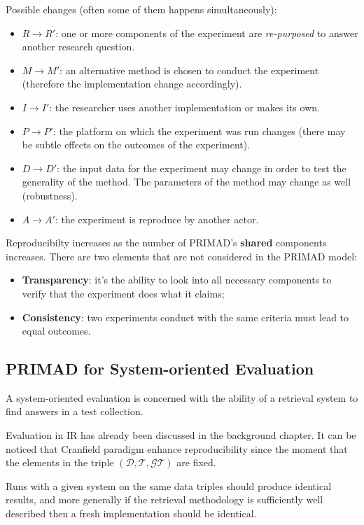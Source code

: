 Possible changes (often some of them happens simultaneously):
\begin{itemize}
\item $R \rightarrow R'$: one or more components of the experiment are \textit{re-purposed} to answer another research question.
\item $M \rightarrow M'$: an alternative method is chosen to conduct the experiment (therefore the implementation change accordingly).
\item $I \rightarrow I'$: the researcher uses another implementation or makes its own.
\item $P \rightarrow P'$: the platform on which the experiment was run changes (there may be subtle effects on the outcomes of the experiment).
\item $D \rightarrow D'$: the input data for the experiment may change in order to test the generality of the method. The parameters of the method may change as well (robustness).
\item $A \rightarrow A'$: the experiment is reproduce by another actor.
\end{itemize}

Reproducibilty increases as the number of PRIMAD's \textbf{shared} components increases.
There are two elements that are not considered in the PRIMAD model:

\begin{itemize}
\item \textbf{Transparency}: it's the ability to look into all necessary components to verify that the experiment does what it claims;
\item \textbf{Consistency}: two experiments conduct with the same criteria must lead to equal outcomes.
\end{itemize}

\subsection{PRIMAD for System-oriented Evaluation}

A system-oriented evaluation is concerned with the ability of a retrieval system to find answers in a test collection.

Evaluation in IR has already been discussed in the background chapter. It can be noticed that Cranfield paradigm enhance reproducibility since the moment that the elements in the triple $(\mathcal{D}, \mathcal{T}, \mathcal{GT})$ are fixed.

Runs with a given system on the same data triples should produce identical results, and more generally if the retrieval methodology is sufficiently well described then a fresh implementation should be identical.

